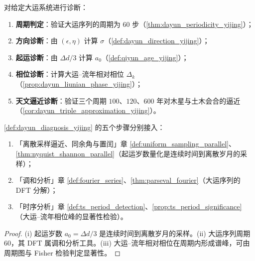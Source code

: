 \begin{definition}[大运周期诊断流程]\label{def:dayun_diagnosis_yijing}
对给定大运系统进行诊断：
\begin{enumerate}[label=(\roman*)]
    \item \textbf{周期判定}：验证大运序列的周期为 $60$ 步（\cref{thm:dayun_periodicity_yijing}）；
    \item \textbf{方向诊断}：由 $(\epsilon,\eta)$ 计算 $\sigma$（\cref{def:dayun_direction_yijing}）；
    \item \textbf{起运诊断}：由 $\Delta d/3$ 计算 $a_0$（\cref{def:qiyun_age_yijing}）；
    \item \textbf{相位诊断}：计算大运--流年相对相位 $\Delta_k$（\cref{prop:dayun_liunian_phase_yijing}）；
    \item \textbf{天文逼近诊断}：验证三个周期 $100$、$120$、$600$ 年对木星与土木会合的逼近（\cref{cor:dayun_triple_approximation_yijing}）。
\end{enumerate}
\end{definition}

\begin{theorem}[大运周期诊断流程与三章接口]\label{thm:dayun_diagnosis_integration_yijing}
\cref{def:dayun_diagnosis_yijing} 的五个步骤分别接入：
\begin{enumerate}[label=(\roman*)]
    \item 「离散采样逼近、同余角与置闰」章 \cref{def:uniform_sampling_parallel}、\cref{thm:nyquist_shannon_parallel}（起运岁数量化是连续时间到离散岁月的采样）；
    \item 「调和分析」章 \cref{def:fourier_series}、\cref{thm:parseval_fourier}（大运序列的 DFT 分解）；
    \item 「时序分析」章 \cref{def:ts_period_detection}、\cref{prop:ts_period_significance}（大运--流年相位峰的显著性检验）。
\end{enumerate}
\end{theorem}

\begin{proof}
(i) 起运岁数 $a_0=\Delta d/3$ 是连续时间到离散岁月的采样。(ii) 大运序列周期 $60$，其 DFT 属调和分析工具。(iii) 大运--流年相对相位在周期内形成谱峰，可由周期图与 Fisher 检验判定显著性。
\end{proof}

